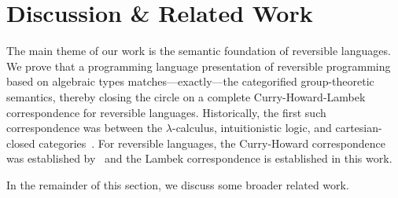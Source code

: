 \section{Discussion \& Related Work}
\label{sec:discussion}


The main theme of our work is the semantic foundation of reversible languages. We prove that a programming language
presentation of reversible programming based on algebraic types matches---exactly---the categorified group-theoretic
semantics, thereby closing the circle on a complete Curry-Howard-Lambek correspondence for reversible
languages. Historically, the first such correspondence was between the $\lambda$-calculus, intuitionistic logic, and
cartesian-closed categories~\cite{curryCurryEssaysCombinatory1980}. For reversible languages, the Curry-Howard
correspondence was established by~\citet{sparksSuperstructuralReversibleLogic2014} and the Lambek correspondence is
established in this work.

In the remainder of this section, we discuss some broader related work.



